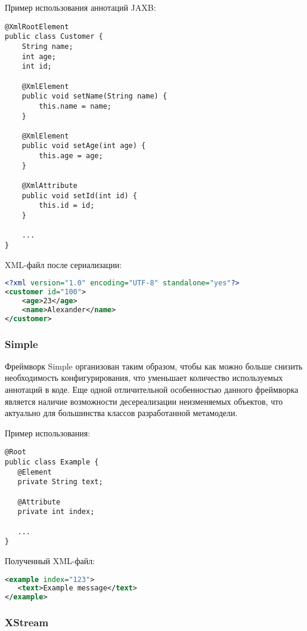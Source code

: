 Пример использования аннотаций JAXB:

\begin{lstlisting}[caption={Пример использования фреймворка JAXB}]
@XmlRootElement
public class Customer {
    String name;
    int age;
    int id;

    @XmlElement
    public void setName(String name) {
        this.name = name;
    }

    @XmlElement
    public void setAge(int age) {
        this.age = age;
    }

    @XmlAttribute
    public void setId(int id) {
        this.id = id;
    }

    ...
}
\end{lstlisting}

XML-файл после сериализации:

\begin{lstlisting}[language=xml, caption={Полученный XML-файл}]
<?xml version="1.0" encoding="UTF-8" standalone="yes"?>
<customer id="100">
    <age>23</age>
    <name>Alexander</name>
</customer>
\end{lstlisting}

\subsubsection{Simple}

Фреймворк Simple организован таким образом, чтобы как можно больше снизить
необходимость конфигурирования, что уменьшает количество используемых аннотаций
в коде. Еще одной отличительной особенностью данного фреймворка является наличие
возможности десереализации неизменяемых объектов, что актуально для большинства
классов разработанной метамодели.

Пример использования:

\begin{lstlisting}[caption={Пример использования фреймворка Simple}]
@Root
public class Example {
   @Element
   private String text;

   @Attribute
   private int index;

   ...
}
\end{lstlisting}

Полученный XML-файл:

\begin{lstlisting}[language=xml, caption={Полученный XML-файл}]
<example index="123">
   <text>Example message</text>
</example>
\end{lstlisting}

\subsubsection{XStream}

